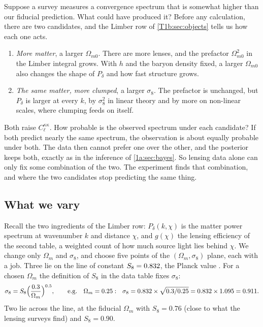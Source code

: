 Suppose a survey measures a convergence spectrum that is somewhat higher than our fiducial prediction. What could have produced it? Before any calculation, there are two candidates, and the Limber row of \cref{T1b:sec:objects} tells us how each one acts.
\begin{enumerate}[leftmargin=1.6em,itemsep=2pt]
\item \emph{More matter}, a larger $\Omega_{m0}$. There are more lenses, and the prefactor $\Omega_{m0}^2$ in the Limber integral grows. With $h$ and the baryon density fixed, a larger $\Omega_{m0}$ also changes the shape of $P_\delta$ and how fast structure grows.
\item \emph{The same matter, more clumped}, a larger $\sigma_8$. The prefactor is unchanged, but $P_\delta$ is larger at every $k$, by $\sigma_8^2$ in linear theory and by more on non-linear scales, where clumping feeds on itself.
\end{enumerate}
Both raise $C_\ell^{\kappa\kappa}$. How probable is the observed spectrum under each candidate? If both predict nearly the same spectrum, the observation is about equally probable under both. The data then cannot prefer one over the other, and the posterior keeps both, exactly as in the inference of \cref{1a:sec:bayes}. So lensing data alone can only fix some combination of the two. The experiment finds that combination, and where the two candidates stop predicting the same thing.

\subsection{What we vary}
\label{T1b:sec:s8-vary}

Recall the two ingredients of the Limber row: $P_\delta(k,\chi)$ is the matter power spectrum at wavenumber $k$ and distance $\chi$, and $g(\chi)$ the lensing efficiency of the second table, a weighted count of how much source light lies behind $\chi$. We change only $\Omega_m$ and $\sigma_8$, and choose five points of the $(\Omega_m,\sigma_8)$ plane, each with a job. Three lie on the line of constant $S_8=0.832$, the Planck value \cite{Planck2018VI}. For a chosen $\Omega_m$ the definition of $S_8$ in the data table fixes $\sigma_8$:
\[
\sigma_8=S_8\Bigl(\frac{0.3}{\Omega_m}\Bigr)^{0.5},\qquad\text{e.g.}\quad
\Omega_m=0.25:\ \ \sigma_8=0.832\times\sqrt{0.3/0.25}=0.832\times1.095=0.911 .
\]
Two lie across the line, at the fiducial $\Omega_m$ with $S_8=0.76$ (close to what the lensing surveys find) and $S_8=0.90$.

